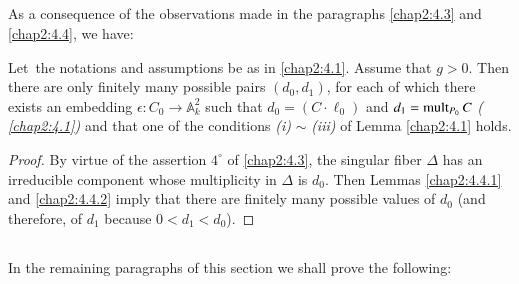 \subsection{}\label{chap2:4.5}
As a consequence of the observations made in the paragraphs \ref{chap2:4.3}
and \ref{chap2:4.4}, we have:

\begin{theorem*}
Let\pageoriginale\ the notations and assumptions be as in
\ref{chap2:4.1}. Assume that $g>0$. Then there are only finitely many
possible pairs $(d_{0},d_{1})$, for each of which there exists an
embedding $\epsilon:C_{0}\to \mathbb{A}^{2}_{k}$ such that
$d_{0}=(C\cdot \ell_{0})$ and $d_{1}=\operatorname{mult}_{P_{0}}C$ {\em (\cf
  \ref{chap2:4.1})} and that one of the conditions {\em (i)} $\sim$ {\em
  (iii)} of Lemma \ref{chap2:4.1} holds.
\end{theorem*}

\begin{proof}
By virtue of the assertion $4^{\circ}$ of \ref{chap2:4.3}, the singular
fiber $\Delta$ has an irreducible component whose multiplicity in
$\Delta$ is $d_{0}$. Then Lemmas \ref{chap2:4.4.1} and \ref{chap2:4.4.2}
imply that there are finitely many possible values of $d_{0}$ (and
therefore, of $d_{1}$ because $0<d_{1}<d_{0}$).
\end{proof}

\subsection{}\label{chap2:4.6}
In the remaining paragraphs of this section we shall prove the
following:


